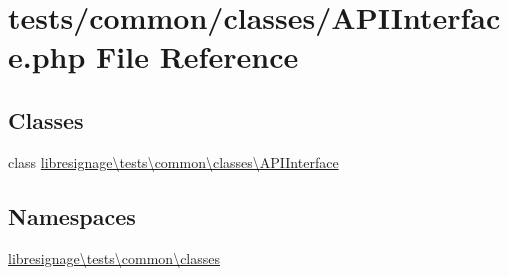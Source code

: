 \hypertarget{APIInterface_8php}{}\section{tests/common/classes/\+A\+P\+I\+Interface.php File Reference}
\label{APIInterface_8php}
\subsection*{Classes}
\begin{DoxyCompactItemize}
\item 
class \hyperlink{classlibresignage_1_1tests_1_1common_1_1classes_1_1APIInterface}{libresignage\textbackslash{}tests\textbackslash{}common\textbackslash{}classes\textbackslash{}\+A\+P\+I\+Interface}
\end{DoxyCompactItemize}
\subsection*{Namespaces}
\begin{DoxyCompactItemize}
\item 
 \hyperlink{namespacelibresignage_1_1tests_1_1common_1_1classes}{libresignage\textbackslash{}tests\textbackslash{}common\textbackslash{}classes}
\end{DoxyCompactItemize}

